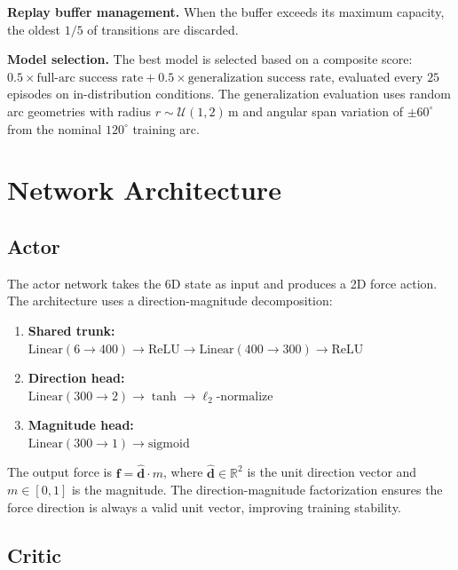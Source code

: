 \noindent\textbf{Replay buffer management.}
When the buffer exceeds its maximum capacity, the oldest $1/5$ of transitions are discarded.

\noindent\textbf{Model selection.}
The best model is selected based on a composite score: $0.5 \times \text{full-arc success rate} + 0.5 \times \text{generalization success rate}$, evaluated every $25$ episodes on in-distribution conditions.
The generalization evaluation uses random arc geometries with radius $r \sim \mathcal{U}(1, 2)$\,m and angular span variation of $\pm 60^\circ$ from the nominal $120^\circ$ training arc.


\section{Network Architecture}\label{app:network}

\subsection{Actor}

The actor network takes the 6D state as input and produces a 2D force action.
The architecture uses a direction-magnitude decomposition:

\begin{enumerate}
    \item \textbf{Shared trunk:}\\
    $\mathrm{Linear}(6 \!\to\! 400) \!\to\! \mathrm{ReLU} \!\to\! \mathrm{Linear}(400 \!\to\! 300) \!\to\! \mathrm{ReLU}$
    \item \textbf{Direction head:}\\
    $\mathrm{Linear}(300 \!\to\! 2) \to \tanh \to \ell_2\text{-normalize}$
    \item \textbf{Magnitude head:}\\
    $\mathrm{Linear}(300 \!\to\! 1) \to \mathrm{sigmoid}$
\end{enumerate}

The output force is $\mathbf{f} = \hat{\mathbf{d}} \cdot m$, where $\hat{\mathbf{d}} \in \mathbb{R}^2$ is the unit direction vector and $m \in [0, 1]$ is the magnitude.
The direction-magnitude factorization ensures the force direction is always a valid unit vector, improving training stability.

\subsection{Critic}

